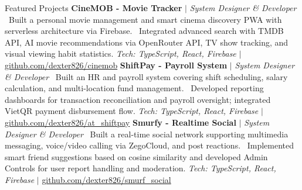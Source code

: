 \begin{rubric}{Featured Projects}
\entry*[]%
    \textbf{CineMOB - Movie Tracker} $|$ \textit{System Designer \& Developer}
    \newline\textbullet\ Built a personal movie management and smart cinema discovery PWA with serverless architecture via Firebase.
    \newline\textbullet\ Integrated advanced search with TMDB API, AI movie recommendations via OpenRouter API, TV show tracking, and visual viewing habit statistics.
    \newline\textit{\small Tech: TypeScript, React, Firebase} $|$ \href{https://github.com/dexter826/cinemob}{\small github.com/dexter826/cinemob}
\entry*[]%
    \textbf{ShiftPay - Payroll System} $|$ \textit{System Designer \& Developer}
    \newline\textbullet\ Built an HR and payroll system covering shift scheduling, salary calculation, and multi-location fund management.
    \newline\textbullet\ Developed reporting dashboards for transaction reconciliation and payroll oversight; integrated VietQR payment disbursement flow.
    \newline\textit{\small Tech: TypeScript, React, Firebase} $|$ \href{https://github.com/dexter826/at_shiftpay}{\small github.com/dexter826/at\_shiftpay}
\entry*[]%
    \textbf{Smurfy - Realtime Social} $|$ \textit{System Designer \& Developer}
    \newline\textbullet\ Built a real-time social network supporting multimedia messaging, voice/video calling via ZegoCloud, and post reactions.
    \newline\textbullet\ Implemented smart friend suggestions based on cosine similarity and developed Admin Controls for user report handling and moderation.
    \newline\textit{\small Tech: TypeScript, React, Firebase} $|$ \href{https://github.com/dexter826/smurf_social}{\small github.com/dexter826/smurf\_social}
\end{rubric}